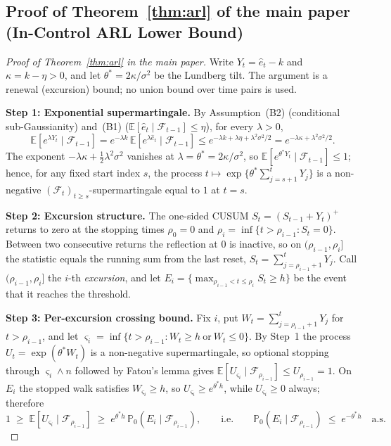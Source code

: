 \documentclass[bj,authoryear]{imsart}
\theoremstyle{plain}
\theoremstyle{definition}
\newcommand{\E}{\mathbb{E}}
\newcommand{\Prob}{\mathbb{P}}
\newcommand{\F}{\mathcal{F}}
\newcommand{\given}{\mid}
\begin{document}
\subsection{Proof of Theorem~\ref{thm:arl} of the main paper (In-Control ARL Lower Bound)}
\label{app:proof-thmarl}

\begin{proof}[Proof of Theorem~\ref{thm:arl} in the main paper]
  Write $Y_t=\hat e_t-k$ and $\kappa=k-\eta>0$, and let
  $\theta^\ast=2\kappa/\sigma^2$ be the Lundberg tilt.  The argument is a
  renewal (excursion) bound; no union bound over time pairs is used.

  \textbf{Step 1: Exponential supermartingale.}
  By Assumption~(B2) (conditional sub-Gaussianity) and~(B1)
  ($\E[\hat e_t\given\F_{t-1}]\leq\eta$), for every $\lambda>0$,
  \[
    \E\!\left[e^{\lambda Y_t}\given\F_{t-1}\right]
    = e^{-\lambda k}\,\E\!\left[e^{\lambda\hat e_t}\given\F_{t-1}\right]
    \leq e^{-\lambda k+\lambda\eta+\lambda^2\sigma^2/2}
    = e^{-\lambda\kappa+\lambda^2\sigma^2/2}.
  \]
  The exponent $-\lambda\kappa+\tfrac12\lambda^2\sigma^2$ vanishes at
  $\lambda=\theta^\ast=2\kappa/\sigma^2$, so
  $\E[e^{\theta^\ast Y_t}\given\F_{t-1}]\leq 1$; hence, for any fixed start
  index $s$, the process
  $t\mapsto\exp\{\theta^\ast\sum_{j=s+1}^t Y_j\}$ is a non-negative
  $(\F_t)_{t\geq s}$-supermartingale equal to $1$ at $t=s$.

  \textbf{Step 2: Excursion structure.}
  The one-sided CUSUM $S_t=(S_{t-1}+Y_t)^+$ returns to zero at the stopping
  times $\rho_0=0$ and $\rho_i=\inf\{t>\rho_{i-1}:S_t=0\}$.  Between two
  consecutive returns the reflection at $0$ is inactive, so on
  $(\rho_{i-1},\rho_i]$ the statistic equals the running sum from the last
  reset, $S_t=\sum_{j=\rho_{i-1}+1}^t Y_j$.  Call $(\rho_{i-1},\rho_i]$ the
  $i$-th \emph{excursion}, and let
  $E_i=\{\max_{\rho_{i-1}<t\leq\rho_i}S_t\geq h\}$ be the event that it reaches
  the threshold.

  \textbf{Step 3: Per-excursion crossing bound.}
  Fix $i$, put $W_t=\sum_{j=\rho_{i-1}+1}^t Y_j$ for $t>\rho_{i-1}$, and let
  $\varsigma_i=\inf\{t>\rho_{i-1}:W_t\geq h\ \text{or}\ W_t\leq0\}$.  By
  Step~1 the process $U_t=\exp(\theta^\ast W_t)$ is a non-negative
  supermartingale, so optional stopping through $\varsigma_i\wedge n$ followed
  by Fatou's lemma gives $\E[U_{\varsigma_i}\given\F_{\rho_{i-1}}]\leq
  U_{\rho_{i-1}}=1$.  On $E_i$ the stopped walk satisfies $W_{\varsigma_i}\geq
  h$, so $U_{\varsigma_i}\geq e^{\theta^\ast h}$, while $U_{\varsigma_i}\geq0$
  always; therefore
  \[
    1\;\geq\;\E[U_{\varsigma_i}\given\F_{\rho_{i-1}}]
     \;\geq\; e^{\theta^\ast h}\,\Prob_0(E_i\given\F_{\rho_{i-1}}),
    \qquad\text{i.e.}\qquad
    \Prob_0(E_i\given\F_{\rho_{i-1}})\;\leq\; e^{-\theta^\ast h}\quad\text{a.s.}
  \]


\end{proof}
\end{document}
